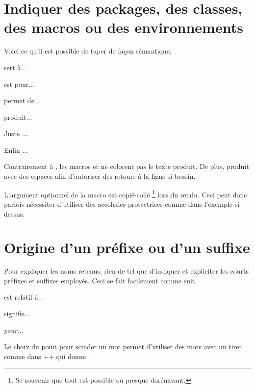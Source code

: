 \documentclass[10pt, a4paper]{article}
\begin{document}
\section{Indiquer des packages, des classes, des macros ou des environnements}

Voici ce qu'il est possible de taper de façon sémantique.


\begin{tdoclatex}[sbs]
 sert à...

 est pour...

 permet de...

 produit...

Juste ...


Enfin ...
\end{tdoclatex}


\begin{tdocrem}
	Contrairement à , les macros  et  ne colorent pas le texte produit.
    De plus,  produit  avec des espaces afin d'autoriser des retours à la ligne si besoin.
\end{tdocrem}


\begin{tdocwarn}
	L'argument optionnel de la macro  est copié-collé
    \footnote{
        Se souvenir que tout est possible ou presque dorénavant.
    }
    lors du rendu. Ceci peut donc parfois nécessiter d'utiliser des accolades protectrices comme dans l'exemple ci-dessus.
\end{tdocwarn}



\section{Origine d'un préfixe ou d'un suffixe}

Pour expliquer les noms retenus, rien de tel que d'indiquer et expliciter les courts préfixes et suffixes employés. Ceci se fait facilement comme suit.


\begin{tdoclatex}[sbs]
 est relatif à...

 signifie...

\emph{ pour...}
\end{tdoclatex}


\begin{tdocrem}
    Le choix du point pour scinder un mot permet d'utiliser des mots avec un tiret comme dans \tdocinlatex++ qui donne .
\end{tdocrem}
\end{document}

